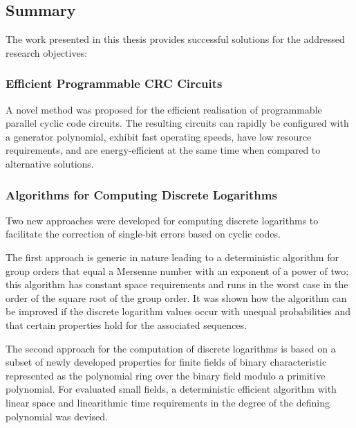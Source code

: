 \documentclass[a4paper, 11pt]{article}
\begin{document}
\subsection{Summary}
The work presented in this thesis provides successful solutions for the addressed research objectives:

\subsubsection{Efficient Programmable CRC Circuits}

A novel method was proposed for the efficient realisation of programmable parallel cyclic code circuits. The resulting circuits can rapidly be configured with a generator polynomial, exhibit fast operating speeds, have low resource requirements, and are energy-efficient at the same time when compared to alternative solutions.

\subsubsection{Algorithms for Computing Discrete Logarithms}

Two new approaches were developed for computing discrete logarithms to facilitate the correction of single-bit errors based on cyclic codes.

The first approach is generic in nature leading to a deterministic algorithm for group orders that equal a Mersenne number with an exponent of a power of two; this algorithm has constant space requirements and runs in the worst case in the order of the square root of the group order. It was shown how the algorithm can be improved if the discrete logarithm values occur with unequal probabilities and that certain properties hold for the associated sequences.

The second approach for the computation of discrete logarithms is based on a subset of newly developed properties for finite fields of binary characteristic represented as the polynomial ring over the binary field modulo a primitive polynomial. For evaluated small fields, a deterministic efficient algorithm with linear space and linearithmic time requirements in the degree of the defining polynomial was devised.

\newpage
%
%
%

\newpage


\end{document}
